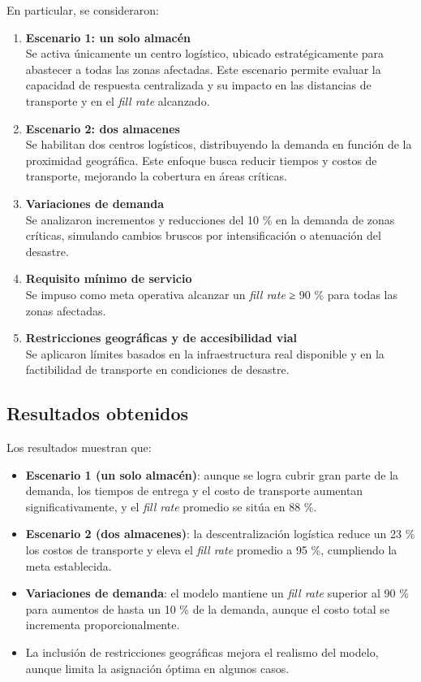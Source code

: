 \documentclass[
  spanish,
  us-letterpaper,
]{scrreprt}
\providecommand{\tightlist}{%
  \setlength{\itemsep}{0pt}\setlength{\parskip}{0pt}}
\numberwithin{equation}{chapter} %
\begin{document}
En particular, se consideraron:

\begin{enumerate}
\def\labelenumi{\arabic{enumi}.}
\item
  \textbf{Escenario 1: un solo almacén}\\
  Se activa únicamente un centro logístico, ubicado estratégicamente
  para abastecer a todas las zonas afectadas. Este escenario permite
  evaluar la capacidad de respuesta centralizada y su impacto en las
  distancias de transporte y en el \emph{fill rate} alcanzado.
\item
  \textbf{Escenario 2: dos almacenes}\\
  Se habilitan dos centros logísticos, distribuyendo la demanda en
  función de la proximidad geográfica. Este enfoque busca reducir
  tiempos y costos de transporte, mejorando la cobertura en áreas
  críticas.
\item
  \textbf{Variaciones de demanda}\\
  Se analizaron incrementos y reducciones del 10 \% en la demanda de
  zonas críticas, simulando cambios bruscos por intensificación o
  atenuación del desastre.
\item
  \textbf{Requisito mínimo de servicio}\\
  Se impuso como meta operativa alcanzar un \emph{fill rate} ≥ 90 \%
  para todas las zonas afectadas.
\item
  \textbf{Restricciones geográficas y de accesibilidad vial}\\
  Se aplicaron límites basados en la infraestructura real disponible y
  en la factibilidad de transporte en condiciones de desastre.
\end{enumerate}

\subsection{Resultados obtenidos}\label{resultados-obtenidos}

Los resultados muestran que:

\begin{itemize}
\tightlist
\item
  \textbf{Escenario 1 (un solo almacén)}: aunque se logra cubrir gran
  parte de la demanda, los tiempos de entrega y el costo de transporte
  aumentan significativamente, y el \emph{fill rate} promedio se sitúa
  en 88 \%.
\item
  \textbf{Escenario 2 (dos almacenes)}: la descentralización logística
  reduce un 23 \% los costos de transporte y eleva el \emph{fill rate}
  promedio a 95 \%, cumpliendo la meta establecida.
\item
  \textbf{Variaciones de demanda}: el modelo mantiene un \emph{fill
  rate} superior al 90 \% para aumentos de hasta un 10 \% de la demanda,
  aunque el costo total se incrementa proporcionalmente.
\item
  La inclusión de restricciones geográficas mejora el realismo del
  modelo, aunque limita la asignación óptima en algunos casos.
\end{itemize}
\end{document}
